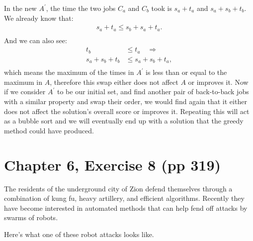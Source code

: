 \documentclass[12pt, letterpaper]{article}
\begin{document}
\noindent In the new $A^{\prime}$, the time the two jobs $C_a$ and $C_b$ took is $s_a + t_a$ and $s_a + s_b + t_b$.
We already know that:
\begin{align*}
    s_a + t_a \leq s_b + s_a + t_a.\\
\end{align*}
And we can also see:
\begin{align*}
    t_b &\leq t_a \quad \Longrightarrow\\
    s_a + s_b + t_b &\leq s_a + s_b + t_a ,\\
\end{align*}
which means the maximum of the times in $A^{\prime}$ is less than or equal to the maximum in $A$, therefore this swap either does not affect $A$ or improves it.
Now if we consider $A^{\prime}$ to be our initial set, and find another pair of back-to-back jobs with a similar property and swap their order, we would find again that it either does not affect the solution's overall score or improves it. 
Repeating this will act as a bubble sort and we will eventually end up with a solution that the greedy method could have produced.


\clearpage

\section{Chapter 6, Exercise 8 (pp 319)}
The residents of the underground city of Zion defend themselves through a combination of kung fu, heavy artillery, and efficient algorithms. 
Recently they have become interested in automated methods that can help fend off attacks by swarms of robots.

Here's what one of these robot attacks looks like.
\end{document}
